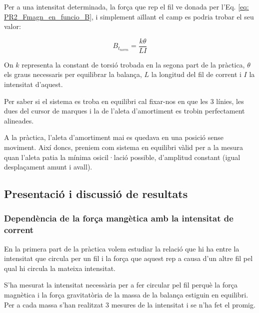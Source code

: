 \documentclass[11pt]{article}
\numberwithin{equation}{section}
\numberwithin{figure}{section}
\numberwithin{table}{section}
\begin{document}
Per a una intensitat determinada, la força que rep el fil ve donada per l’Eq. \eqref{eq: PR2_Fmagn_en_funcio_B}, i simplement aïllant el camp es podria trobar el seu valor:

\begin{equation}\label{eq: PR2_Btnorm}
    B_{t_{norm}} = \frac{k\theta}{LI}
\end{equation}

On $k$ representa la constant de torsió trobada en la segona part de la pràctica, $\theta$ els graus necessaris per equilibrar la balança, $L$ la longitud del fil de corrent i $I$ la intensitat d'aquest.


Per saber si el sistema es troba en equilibri cal fixar-nos en que les 3 línies, les dues del cursor de marques i la de l'aleta d'amortiment es trobin perfectament alineades. 

A la pràctica, l'aleta d'amortiment mai es quedava en una posició sense moviment. Així doncs, preniem com sistema en equilibri vàlid per a la mesura quan l'aleta patia la mínima osicil·lació possible, d'amplitud constant (igual desplaçament amunt i avall).

\subsection{Presentació i discussió de resultats}\label{sec: PR2_resultats}

\subsubsection{Dependència de la força mangètica amb la intensitat de corrent}\label{sec: PR2_Fm_intensitat}

En la primera part de la pràctica volem estudiar la relació que hi ha entre la intensitat que circula per un fil i la força que aquest rep a causa d’un altre fil pel qual hi circula la mateixa intensitat. 

S’ha mesurat la intensitat necessària per a fer circular pel fil perquè la força magnètica i la força gravitatòria de la massa de la balança estiguin en equilibri. Per a cada massa s’han realitzat 3 mesures de la intensitat i se n’ha fet el promig.
\end{document}
